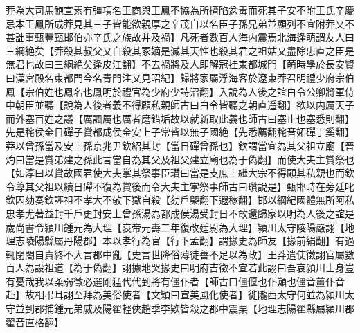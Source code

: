 莽為大司馬鮑宣素冇彊項名王商與王鳳不協為所擠陷忿毒而死其子安不附王氏辛慶忌本王鳳所成莽見其三子皆能欲親厚之辛茂自以名臣子孫兄弟並顯列不宜附莽又不甚詘事甄豐甄邯伯亦辛氏之族故并及禍】凡死者數百人海内震焉北海逢萌謂友人曰三綱絶矣【莽殺其叔父又自殺其冢嫡是滅其天性也殺其君之祖姑又盡除忠直之臣是無君也故曰三綱絶矣逢皮江翻】不去禍將及人即解冠挂東都城門【萌時學於長安賢曰漢宮殿名東都門今名青門注又見昭紀】歸將家屬浮海客於遼東莽召明禮少府宗伯鳳【宗伯姓也鳳名也鳳明於禮官為少府少詩沼翻】入說為人後之誼白令公卿將軍侍中朝臣並聽【說為人後者義不得顧私親師古曰白令皆聽之朝直遥翻】欲以内厲天子而外塞百姓之議【厲諷厲也厲者磨錯垢故以就新取此義也師古曰塞止也塞悉則翻】先是秺侯金日磾子賞都成侯金安上子常皆以無子國絶【先悉薦翻秺音妬磾丁奚翻】莽以曾孫當及安上孫京兆尹欽紹其封【當日磾曾孫也】欽謂當宜為其父祖立廟【晉灼曰當是賞弟建之孫此言當自為其父及祖父建立廟也為于偽翻】而使大夫主賞祭也【如淳曰以賞故國君使大夫掌其祭事臣瓚曰當是支庶上繼大宗不得顧其私親也而欽令尊其父祖以續日磾不復為賞後而令大夫主掌祭事師古曰瓚說是】甄邯時在旁廷叱欽因劾奏欽誣祖不孝大不敬下獄自殺【劾戶槩翻下遐稼翻】邯以綱紀國體無所阿私忠孝尤著益封千戶更封安上曾孫湯為都成侯湯受封日不敢還歸家以明為人後之誼是歲尚書令潁川鍾元為大理【哀帝元夀二年復改廷尉為大理】潁川太守陵陽嚴詡【地理志陵陽縣屬丹陽郡】本以孝行為官【行下孟翻】謂掾史為師友【掾前絹翻】有過輒閉閤自責終不大言郡中亂【史言世降俗薄徒善不足以為政】王莽遣使徵詡官屬數百人為設祖道【為于偽翻】詡據地哭掾史曰明府吉徵不宜若此詡曰吾哀潁川士身豈有憂哉我以柔弱徵必選剛猛代代到將有僵仆者【師古曰僵偃也仆顚也僵音薑仆音赴】故相弔耳詡至拜為美俗使者【文穎曰宣美風化使者】徙隴西太守何並為潁川太守並到郡捕鍾元弟威及陽翟輕俠趙季李欵皆殺之郡中震栗【地理志陽翟縣屬潁川郡翟音直格翻】

